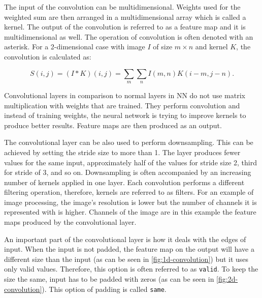 The input of the convolution can be multidimensional. Weights used for the weighted sum are then arranged in a multidimensional array which is called a kernel. The output of the convolution is referred to as a feature map and it is multidimensional as well. The operation of convolution is often denoted with an asterisk. For a 2-dimensional case with image $I$ of size $m \times n$ and kernel $K$, the convolution is calculated as:

$$ S(i, j) = (I * K)(i, j) = \sum\limits_m \sum\limits_n I(m, n) K(i-m, j-n) .$$

Convolutional layers in comparison to normal layers in NN do not use matrix multiplication with weights that are trained. They perform convolution and instead of training weights, the neural network is trying to improve kernels to produce better results. Feature maps are then produced as an output.

The convolutional layer can be also used to perform downsampling. This can be achieved by setting the stride size to more than 1. The layer produces fewer values for the same input, approximately half of the values for stride size 2, third for stride of 3, and so on. Downsampling is often accompanied by an increasing number of kernels applied in one layer. Each convolution performs a different filtering operation, therefore, kernels are referred to as filters. For an example of image processing, the image's resolution is lower but the number of channels it is represented with is higher. Channels of the image are in this example the feature maps produced by the convolutional layer.

An important part of the convolutional layer is how it deals with the edges of input. When the input is not padded, the feature map on the output will have a different size than the input (as can be seen in \autoref{fig:1d-convolution}) but it uses only valid values. Therefore, this option is often referred to as \texttt{valid}. To keep the size the same, input has to be padded with zeros (as can be seen in \autoref{fig:2d-convolution}). This option of padding is called \texttt{same}.

